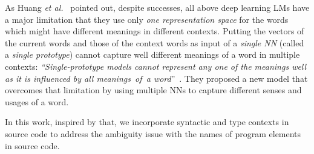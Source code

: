 
As Huang {\em et al.}~\cite{huang12} pointed out, despite 
successes, all above deep learning LMs 
have a major limitation that they use only {\em one representation
  space} for the words which might have different meanings in
  different contexts. Putting the vectors of the current words and
  those of the context words as input of a {\em single NN} (called a
  {\em single prototype}) cannot capture well different meanings of a
  word in multiple contexts: {\em ``Single-prototype models cannot
  represent any one of the meanings well as it is influenced by all
  meanings~of~a word}''~\cite{huang12}.
%
They proposed a new model that overcomes that
limitation by using multiple NNs to capture different senses and
usages of a word.



In this work, inspired by that, we incorporate syntactic and type
contexts in source code to address the ambiguity issue with the names
of program elements in source code.

